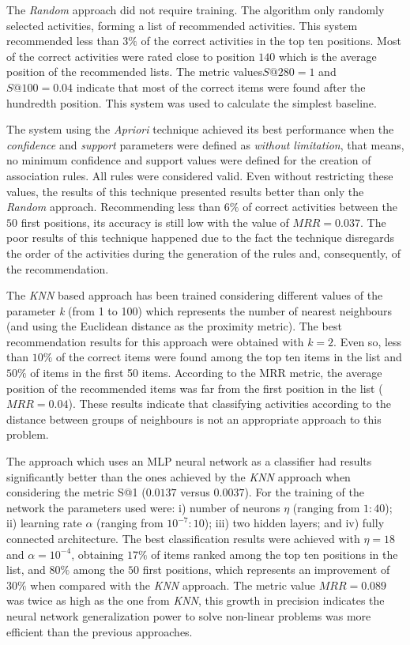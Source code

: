 \documentclass{doublecol-new}
\theoremstyle{TH}{
\newtheorem{lemma}{Lemma}
\newtheorem{theorem}[lemma]{Theorem}
\newtheorem{corrolary}[lemma]{Corrolary}
\newtheorem{conjecture}[lemma]{Conjecture}
\newtheorem{proposition}[lemma]{Proposition}
\newtheorem{claim}[lemma]{Claim}
\newtheorem{stheorem}[lemma]{Wrong Theorem}
\newtheorem{algorithm}{Algorithm}
}
\theoremstyle{THrm}{
\newtheorem{definition}{Definition}[section]
\newtheorem{question}{Question}[section]
\newtheorem{remark}{Remark}
\newtheorem{scheme}{Scheme}
}
\theoremstyle{THhit}{
\newtheorem{case}{Case}[section]
}
\begin{document}
\egroup


The \emph{Random} approach did not require training. The algorithm only randomly selected activities, forming a list of recommended activities. This system recommended less than \(3\%\) of the correct activities in the top ten positions. Most of the correct activities were rated close to position \(140\) which is the average position of the recommended lists. The metric values ​​\(S@280 = 1\) and \(S@100 = 0.04\) indicate that most of the correct items were found after the hundredth position. This system was used to calculate the simplest baseline.

The system using the \emph{Apriori} technique achieved its best performance when the \emph{confidence} and \emph{support} parameters were defined as \emph{without limitation}, that means, no minimum confidence and support values were defined for the creation of association rules. All rules were considered valid. Even without restricting these values, the results of this technique presented results better than only the \emph{Random} approach. Recommending less than \(6\%\) of correct activities between the \(50\) first positions, its accuracy is still low with the value of \(MRR = 0.037\). The poor results of this technique happened due to the fact the technique disregards the order of the activities during the generation of the rules and, consequently, of the recommendation.

The \emph{KNN}  based approach has been trained considering different values ​​of the parameter \emph{k} (from 1 to 100) which represents the number of nearest neighbours (and using the Euclidean distance as the proximity metric). The best recommendation results for this approach were obtained with \(k = 2\). Even so, less than \(10​​\%\) of the correct items were found among the top ten items in the list and \(50\%\) of items in the first 50 items. According to the MRR metric, the average position of the recommended items was far from the first position in the list (\(MRR = 0.04\)). These results indicate that classifying activities according to the distance between groups of neighbours is not an appropriate approach to this problem.

The approach which uses an MLP neural network as a classifier had results significantly better than the ones achieved by the \emph{KNN} approach when considering the metric S@1 (\(0.0137\) versus \(0.0037\)). For the training of the network the parameters used were: i) number of neurons \(\eta\) (ranging from \(1:40\)); ii) learning rate \(\alpha\) (ranging from \(10^{-7}: 10\)); iii) two hidden layers; and iv) fully connected architecture. The best classification results were achieved with \(\eta = 18\) and \(\alpha = 10^{-4}\), obtaining \(17\%\) of items ranked among the top ten positions in the list, and \(80\%\) among the \(50\) first positions, which represents an improvement of \(30\%\) when compared with the \emph{KNN} approach. The metric value \(MRR = 0.089\) was twice as high as the one from \emph{KNN}, this growth in precision indicates the neural network generalization power to solve non-linear problems was more efficient than the previous approaches.
\end{document}
